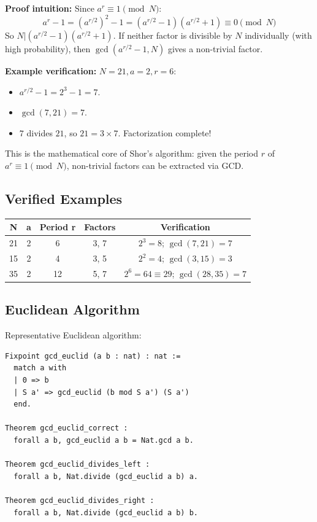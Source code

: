 \textbf{Proof intuition:} Since $a^r \equiv 1 \pmod{N}$:
\[
a^r - 1 = (a^{r/2})^2 - 1 = (a^{r/2} - 1)(a^{r/2} + 1) \equiv 0 \pmod{N}
\]
So $N | (a^{r/2} - 1)(a^{r/2} + 1)$. If neither factor is divisible by $N$ individually (with high probability), then $\gcd(a^{r/2} - 1, N)$ gives a non-trivial factor.

\textbf{Example verification:} $N=21, a=2, r=6$:
\begin{itemize}
    \item $a^{r/2} - 1 = 2^3 - 1 = 7$.
    \item $\gcd(7, 21) = 7$.
    \item $7$ divides $21$, so $21 = 3 \times 7$. Factorization complete!
\end{itemize}

This is the mathematical core of Shor's algorithm: given the period $r$ of $a^r \equiv 1 \pmod{N}$, non-trivial factors can be extracted via GCD.


\subsection{Verified Examples}

\begin{center}
\begin{tabular}{|c|c|c|c|c|}
\hline
\textbf{N} & \textbf{a} & \textbf{Period r} & \textbf{Factors} & \textbf{Verification} \\
\hline
21 & 2 & 6 & 3, 7 & $2^3 = 8$; $\gcd(7, 21) = 7$ \\
15 & 2 & 4 & 3, 5 & $2^2 = 4$; $\gcd(3, 15) = 3$ \\
35 & 2 & 12 & 5, 7 & $2^6 = 64 \equiv 29$; $\gcd(28, 35) = 7$ \\
\hline
\end{tabular}
\end{center}

\subsection{Euclidean Algorithm}

Representative Euclidean algorithm:
\begin{lstlisting}
Fixpoint gcd_euclid (a b : nat) : nat :=
  match a with
  | 0 => b
  | S a' => gcd_euclid (b mod S a') (S a')
  end.

Theorem gcd_euclid_correct :
  forall a b, gcd_euclid a b = Nat.gcd a b.

Theorem gcd_euclid_divides_left :
  forall a b, Nat.divide (gcd_euclid a b) a.

Theorem gcd_euclid_divides_right :
  forall a b, Nat.divide (gcd_euclid a b) b.
\end{lstlisting}

